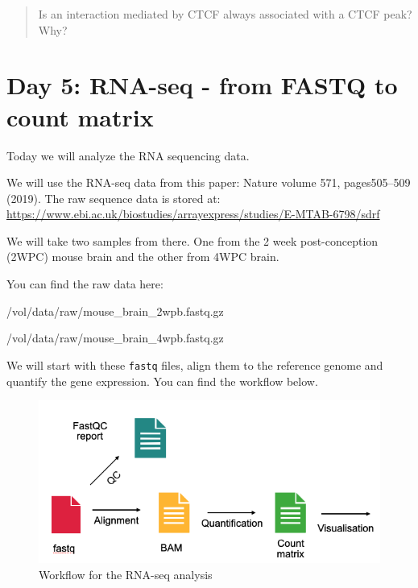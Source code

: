 \documentclass[
]{book}
\newenvironment{Shaded}{\begin{snugshade}}{\end{snugshade}}
\newcommand{\NormalTok}[1]{#1}
\begin{document}
\begin{quote}
Is an interaction mediated by CTCF always associated with a CTCF peak? Why?
\end{quote}

\hypertarget{day-5-rna-seq---from-fastq-to-count-matrix}{%
\section{Day 5: RNA-seq - from FASTQ to count matrix}\label{day-5-rna-seq---from-fastq-to-count-matrix}}

Today we will analyze the RNA sequencing data.

We will use the RNA-seq data from this paper: Nature volume 571, pages505--509 (2019). The raw sequence data is stored at: \url{https://www.ebi.ac.uk/biostudies/arrayexpress/studies/E-MTAB-6798/sdrf}

We will take two samples from there. One from the 2 week post-conception (2WPC) mouse brain and the other from 4WPC brain.

You can find the raw data here:

\begin{Shaded}
\begin{Highlighting}[]
\NormalTok{/vol/data/raw/mouse\_brain\_2wpb.fastq.gz}


\NormalTok{/vol/data/raw/mouse\_brain\_4wpb.fastq.gz}
\end{Highlighting}
\end{Shaded}

We will start with these \texttt{fastq} files, align them to the reference genome and quantify the gene expression. You can find the workflow below.

\begin{figure}
\centering
\includegraphics{figures/workflow.png}
\caption{Workflow for the RNA-seq analysis}
\end{figure}
\end{document}
